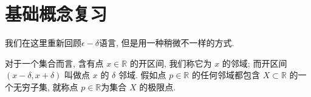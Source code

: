 \documentclass{ctexart}
\begin{document}
\section{基础概念复习}

我们在这里重新回顾$\epsilon-\delta$语言, 但是用一种稍微不一样的方式.

对于一个集合而言, 含有点 $x \in \mathbb{R}$ 的开区间, 我们称它为 $x$ 的邻域; 而开区间 $( x-\delta, x+\delta )$ 叫做点 $x$ 的 $\delta$ 邻域.
假如点 $p \in \mathbb{R}$ 的任何邻域都包含 $X \subset \mathbb{R}$ 的一个无穷子集, 就称点 $p \in \mathbb{R}$为集合 $X$ 的极限点.
\end{document}
